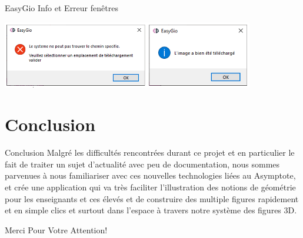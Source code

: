 \documentclass{beamer}
\begin{document}
\begin{frame}{EasyGio Info et Erreur fenêtres}
\begin{center}
    \includegraphics[width=11cm]{pic/nots.PNG}
\end{center}
\end{frame}
\section{Conclusion}
\begin{frame}{Conclusion}
Malgré les difficultés rencontrées durant ce projet et en particulier le fait de traiter un sujet d’actualité avec peu de documentation, nous sommes parvenues à nous familiariser avec ces nouvelles technologies liées au Asymptote, et crée une application qui va très faciliter l'illustration des notions de géométrie pour les enseignants et ces élevés et de construire des multiple figures rapidement et en simple clics et surtout dans l'espace à travers notre système des figures 3D.
\end{frame}
\begin{frame}
    \begin{center}
        {\Huge\calligra Merci Pour Votre Attention!}
    \end{center}
\end{frame}
\end{document}
